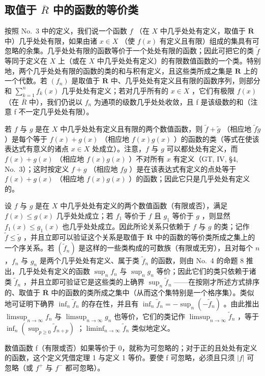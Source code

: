 \subsection{\texorpdfstring{取值于 \(\overline{R}\) 中的函数的等价类}{取值于 R-bar 中的函数的等价类}}

按照 No.~3 中的定义，我们说一个函数 \(f\) （在 \(X\) 中几乎处处有定义，取值于 \(\overline{\mathbf{R}}\) 中）几乎处处有限，如果由诸 \(x \in X\) （使 \(f(x)\) 有定义且有限）组成的集具有可忽略的余集。几乎处处有限的函数等价于一个处处有限的函数；因此可把它的类 \(\widetilde{f}\) 等同于定义在 \(X\) 上（或在 \(X\) 中几乎处处有定义）的有限数值函数的一个类。特别地，两个几乎处处有限的函数的类的和与积有定义，且这些类所成之集是 \(\mathbf{R}\) 上的一个代数。若 \((f_n)\) 是取值于 \(\overline{\mathbf{R}}\) 中、几乎处处有定义且有限的函数序列，则部分和 \(\sum_{k=1}^{n} f_k(x)\) 几乎处处有定义；若对几乎所有的 \(x \in X\) ，它们有极限 \(f(x)\) （在 \(\overline{R}\) 中），我们仍说以 \(f_{n}\) 为通项的级数几乎处处收敛，且 f 是该级数的和（注意 f 不一定几乎处处有限）。

若 \(f\) 与 \(g\) 是在 \(X\) 中几乎处处有定义且有限的两个数值函数，则 \(\widetilde{f} + \widetilde{g}\) （相应地 \(\widetilde{f}\widetilde{g}\) ）是每个等于 \(f(x) + g(x)\) （相应地 \(f(x)g(x)\) ）的函数的类（等式在使该表达式有意义的诸点 \(x \in X\) 处成立）。注意，\(f\) 与 \(g\) 可以都处处有定义，而 \(f(x) + g(x)\) （相应地 \(f(x)g(x)\) ）不对所有 \(x\) 有定义（GT, IV, §4, No.~3）；这时按定义 \(f + g\) （相应地 \(fg\) ）是在该表达式有定义的点处等于 \(f(x) + g(x)\) （相应地 \(f(x)g(x)\) ）的函数；因此它只是几乎处处有定义的。

设 \(f\) 与 \(g\) 是在 \(X\) 中几乎处处有定义的两个数值函数（有限或否），满足 \(f(x) \leqslant g(x)\) 几乎处处成立；若 \(f_1\) 等价于 \(f\) 且 \(g_1\) 等价于 \(g\) ，则显然 \(f_1(x) \leqslant g_1(x)\) 也几乎处处成立。因此所论关系只依赖于 \(f\) 与 \(g\) 的类；记作 \(\widetilde{f} \leqslant \widetilde{g}\) ，并且立即可以验证这个关系是取值于 \(\overline{\mathbf{R}}\) 中的函数的等价类所成之集上的一个序关系。若 \((\widetilde{f}_n)\) 是这样的一些类构成的可数族（有限或无穷），且对每个 \(n\) ，\(f_n\) 与 \(g_n\) 是两个几乎处处有定义、属于类 \(\widetilde{f}_n\) 的函数，则由 No.~4 的命题 8 推出，几乎处处有定义的函数 \(\sup_n f_n\) 与 \(\sup_n g_n\) 等价；因此它们的类只依赖于诸类 \(\widetilde{f}_n\) ，并且立即可验证它是这些类的上确界 \(\sup_n \widetilde{f}_n\) ——在按刚才所述方式排序的、取值于 \(\overline{\mathbf{R}}\) 中的函数的类所成之集中（从而这个集特别是一个格序集）。类似地可证明下确界 \(\inf_n \widetilde{f}_n\) 的存在性，并且有 \(\inf_n \widetilde{f}_n = -\sup_n (-\widetilde{f}_n)\) 。由此推出 \(\limsup_{n \to \infty} f_n\) 与 \(\limsup_{n \to \infty} g_n\) 也等价，它们的类记作 \(\limsup_{n \to \infty} \widetilde{f}_n\) ，等于 \(\inf_n (\sup_{p \geqslant 0} \widetilde{f}_{n+p})\) ；\(\liminf_{n \to \infty} \widetilde{f}_n\) 类似地定义。

数值函数 f（有限或否）如果等价于 0，就称为可忽略的；对于正的且处处有定义的函数，这个定义凭借定理 1 与定义 1 等价。要使 f 可忽略，必须且只须 \(|f|\) 可忽略（或 \(f^{+}\) 与 \(f^{-}\) 都可忽略）。

